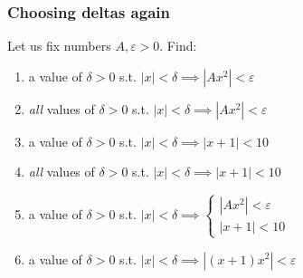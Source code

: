 \documentclass[14pt]{beamer}
\begin{document}
\begin{frame}[t]
	\frametitle{Choosing deltas again}

	Let us fix numbers $A, \varepsilon >0$. Find:

	\vfill

	\begin{enumerate}
		\item a value of $\delta >0$ \; s.t. \hfill
			$\displaystyle |x|< \delta \implies |Ax^{2}|<\varepsilon$
			\vfill

		\item \emph{all} values of $\delta >0$ \; s.t. \hfill $\displaystyle |x|< \delta
			\implies |Ax^{2}|<\varepsilon$
			\vfill

		\item a value of $\delta >0$ \; s.t. \hfill
			$\displaystyle |x|< \delta \implies |x+1| < 10$
			\vfill

		\item \emph{all} values of $\delta >0$ \; s.t. \hfill $\displaystyle |x|< \delta
			\implies |x+1| < 10$
			\vfill

		\item a value of $\delta >0$ \; s.t. \hfill
			$\displaystyle |x|< \delta \implies \left\{
			\begin{array}{c}
				|Ax^2|<\varepsilon \\
				|x+1| < 10
			\end{array}
			\right.$
			\vfill

		\item a value of $\delta >0$ \; s.t. \hfill
			$\displaystyle |x| < \delta \implies |(x+1)x^{2}| < \varepsilon$
			\vfill
	\end{enumerate}
\end{frame}
\end{document}
